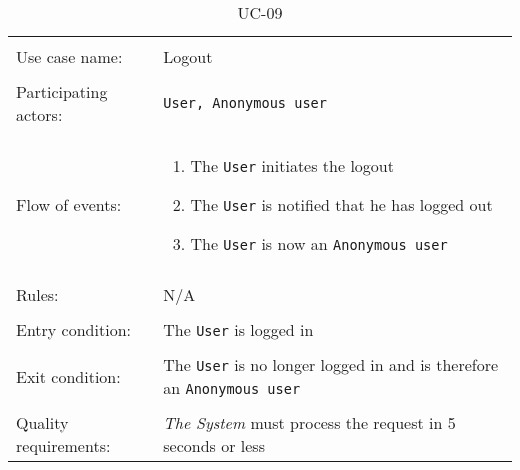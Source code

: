 \noindent
\begin{table}[h!]
\caption{UC-09}
\label{UC-09}
\centering
\begin{tabular}{ l p{8cm} }  
\hline           
\\       
Use case name:  & Logout   \\   \hline \\               
Participating actors:  & \texttt{User, Anonymous user} \\   \hline \\         
Flow of events: & \begin{enumerate}
\item{The \texttt{User} initiates the logout}
\item{The \texttt{User} is notified that he has logged out}
\item{The \texttt{User} is now an \texttt{Anonymous user}}
\end{enumerate}
\\   \hline \\
Rules: & N/A \\ \hline \\
Entry condition: & The \texttt{User} is logged in \\ \hline \\
Exit condition: & The \texttt{User} is no longer logged in and is therefore an \texttt{Anonymous user} \\ \hline \\
Quality requirements: & \textit{The System} must process the request in 5 seconds or less \\ \hline             
\end{tabular} \\
\end{table}
\\ \\ \\

